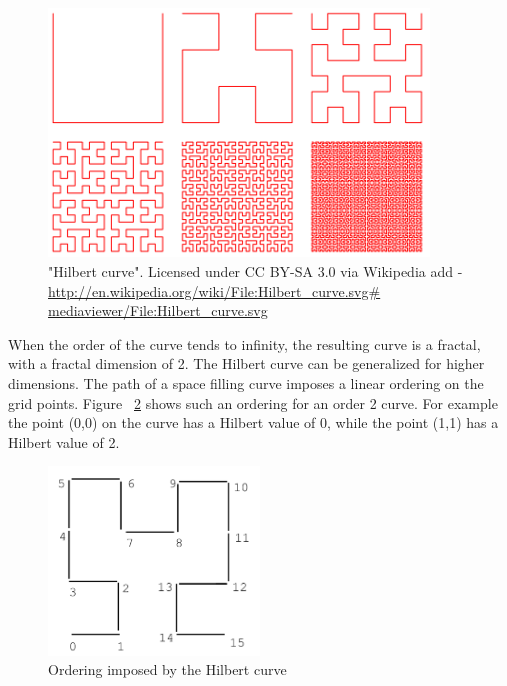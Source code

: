 \documentclass[11pt, a4paper, oneside]{article}
\begin{document}
\begin{figure}[h!]
  \centering
    \includegraphics[width=0.9\textwidth]{img/Hilbert6}
    \caption{"Hilbert curve". Licensed under CC BY-SA 3.0 via Wikipedia add -  \protect\url{http://en.wikipedia.org/wiki/File:Hilbert_curve.svg\# mediaviewer/File:Hilbert_curve.svg}}
  \label{fig:hilbert}
\end{figure}


When the order of the curve tends to infinity, the resulting curve is a fractal, with a fractal dimension of 2. The Hilbert curve can be generalized for higher dimensions. The path of a space filling curve imposes a linear ordering on the grid points. Figure ~\ref{fig:hilbert-ordering} shows such an ordering for an order 2 curve. For example the point (0,0) on the curve has a Hilbert value of 0, while the point (1,1) has a Hilbert value of 2. 

\begin{figure}[h!]
  \centering
    \includegraphics[width=0.5\textwidth]{img/HilbertOrdering}
    \caption{Ordering imposed by the Hilbert curve {\cite{Kamel:1994:HRI:645920.673001}} }
  \label{fig:hilbert-ordering}
\end{figure}
\end{document}

